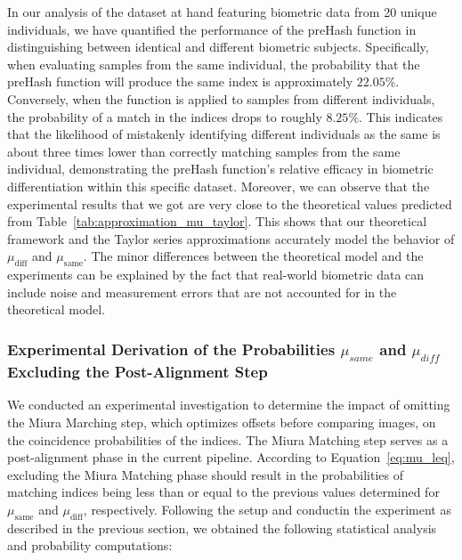 In our analysis of the dataset at hand featuring biometric data from 20 unique individuals, we have quantified the performance of the preHash function in distinguishing between identical and different biometric subjects. Specifically, when evaluating samples from the same individual, the probability that the preHash function will produce the same index is approximately \(22.05\%\). Conversely, when the function is applied to samples from different individuals, the probability of a match in the indices drops to roughly \(8.25\%\). This indicates that the likelihood of mistakenly identifying different individuals as the same is about three times lower than correctly matching samples from the same individual, demonstrating the preHash function's relative efficacy in biometric differentiation within this specific dataset. Moreover, we can observe that the experimental results that we got are very close to the theoretical values predicted from Table~\ref{tab:approximation_mu_taylor}. This shows that our theoretical framework and the Taylor series approximations accurately model the behavior of \(\mu_{\text{diff}}\) and \(\mu_{\text{same}}\). The minor differences between the theoretical model and the experiments can be explained by the fact that real-world biometric data can include noise and measurement errors that are not accounted for in the theoretical model.


\subsubsection{Experimental Derivation of the Probabilities \(\mu_{same}\) and \(\mu_{diff}\) Excluding the Post-Alignment Step}

We conducted an experimental investigation to determine the impact of omitting the Miura Marching step, which optimizes offsets before comparing images, on the coincidence probabilities of the indices. The Miura Matching step serves as a post-alignment phase in the current pipeline. According to Equation~\ref{eq:mu_leq}, excluding the Miura Matching phase should result in the probabilities of matching indices being less than or equal to the previous values determined for \(\mu_{\text{same}}\) and \(\mu_{\text{diff}}\), respectively.
Following the setup and conductin the experiment as described in the previous section, we obtained the following statistical analysis and probability computations:


